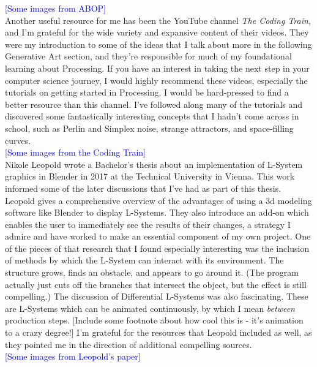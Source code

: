\documentclass[12pt,twoside]{reedthesis}
\begin{document}
	\textcolor{blue}{[Some images from ABOP]}\\
	
	Another useful resource for me has been the YouTube channel \textit{The Coding Train}, and I'm grateful for the wide variety and expansive content of their videos. They were my introduction to some of the ideas that I talk about more in the following Generative Art section, and they're responsible for much of my foundational learning about Processing. If you have an interest in taking the next step in your computer science journey, I would highly recommend these videos, especially the tutorials on getting started in Processing. I would be hard-pressed to find a better resource than this channel. I've followed along many of the tutorials and discovered some fantastically interesting concepts that I hadn't come across in school, such as Perlin and Simplex noise, strange attractors, and space-filling curves.\\
	
	\textcolor{blue}{[Some images from the Coding Train]}\\
	
	Nikole Leopold wrote a Bachelor's thesis about an implementation of L-System graphics in Blender in 2017 at the Technical University in Vienna. This work informed some of the later discussions that I've had as part of this thesis. Leopold gives a comprehensive overview of the advantages of using a 3d modeling software like Blender to display L-Systems. They also introduce an add-on which enables the user to immediately see the results of their changes, a strategy I admire and have worked to make an essential component of my own project. One of the pieces of that research that I found especially interesting was the inclusion of methods by which the L-System can interact with its environment. The structure grows, finds an obstacle, and appears to go around it. (The program actually just cuts off the branches that intersect the object, but the effect is still compelling.) The discussion of Differential L-Systems was also fascinating. These are L-Systems which can be animated continuously, by which I mean \textit{between} production steps. [Include some footnote about how cool this is - it's animation to a crazy degree!] I'm grateful for the resources that Leopold included as well, as they pointed me in the direction of additional compelling sources.\\
	
	\textcolor{blue}{[Some images from Leopold's paper]}\\
	
\end{document}

